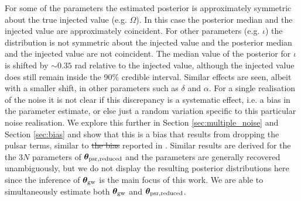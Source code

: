 \documentclass[fleqn,usenatbib,useAMS]{mnras}
\providecommand{\DIFadd}[1]{{\protect\color{blue}\uwave{#1}}} %
\providecommand{\DIFdel}[1]{{\protect\color{red}\sout{#1}}}                      %
\providecommand{\DIFaddbegin}{} %
\providecommand{\DIFaddend}{} %
\providecommand{\DIFdelbegin}{} %
\providecommand{\DIFdelend}{} %
\newcommand{\DIFscaledelfig}{0.5}
\newlength{\DIFdelgraphicswidth} %
\newlength{\DIFdelgraphicsheight} %
\newcommand{\DIFaddincludegraphics}[2][]{{\color{blue}\fbox{\DIFOincludegraphics[#1]{#2}}}} %
\newcommand{\DIFdelincludegraphics}[2][]{%
\sbox{\DIFdelgraphicsbox}{\DIFOincludegraphics[#1]{#2}}%
\settoboxwidth{\DIFdelgraphicswidth}{\DIFdelgraphicsbox} %
\settoboxtotalheight{\DIFdelgraphicsheight}{\DIFdelgraphicsbox} %
\scalebox{\DIFscaledelfig}{%
\parbox[b]{\DIFdelgraphicswidth}{\usebox{\DIFdelgraphicsbox}\\[-\baselineskip] \rule{\DIFdelgraphicswidth}{0em}}\llap{\resizebox{\DIFdelgraphicswidth}{\DIFdelgraphicsheight}{%
\setlength{\unitlength}{\DIFdelgraphicswidth}%
\begin{picture}(1,1)%
\thicklines\linethickness{2pt} %
{\color[rgb]{1,0,0}\put(0,0){\framebox(1,1){}}}%
{\color[rgb]{1,0,0}\put(0,0){\line( 1,1){1}}}%
{\color[rgb]{1,0,0}\put(0,1){\line(1,-1){1}}}%
\end{picture}%
}\hspace*{3pt}}} %
} %
\DeclareRobustCommand{\DIFaddbegin}{\DIFOaddbegin \let\includegraphics\DIFaddincludegraphics} %
\DeclareRobustCommand{\DIFaddend}{\DIFOaddend \let\includegraphics\DIFOincludegraphics} %
\DeclareRobustCommand{\DIFdelbegin}{\DIFOdelbegin \let\includegraphics\DIFdelincludegraphics} %
\DeclareRobustCommand{\DIFdelend}{\DIFOaddend \let\includegraphics\DIFOincludegraphics} %
\begin{document}
 
 For some of the parameters the estimated posterior is approximately symmetric about the true injected value (e.g. $\Omega$). In this case the posterior median and the injected value are approximately coincident. For other parameters (e.g. $\iota$) the distribution is not symmetric about the injected value and the posterior median and the injected value are not coincident. The median value of the posterior for $\iota$ is shifted by $\sim 0.35$ rad relative to the injected value, although the injected value does still remain inside the 90\% credible interval. Similar effects are seen, albeit with a smaller shift, in other parameters such as $\delta$ and $\alpha$. For a single realisation of the noise it is not clear if this discrepancy is a systematic effect, i.e. a bias in the parameter estimate, or else just a random variation specific to this particular noise realisation. We explore this further in Section \ref{sec:multiple_noise} and Section \ref{sec:bias} and show that this is a bias that results from dropping the pulsar terms, similar to \DIFdelbegin \DIFdel{the bias }\DIFdelend \DIFaddbegin \DIFadd{that }\DIFaddend reported in \cite{Zhupulsarterms}. Similar results are derived for the the 3$N$ parameters of $\boldsymbol{\theta}_{\rm psr, reduced}$ and the parameters are generally recovered unambiguously, but we do not display the resulting posterior distributions here since the inference of $\boldsymbol{\theta}_{\rm gw}$ is the main focus of this work. We are able to simultaneously estimate both $\boldsymbol{\theta}_{\rm gw}$ and $\boldsymbol{\theta}_{\rm psr, reduced}$. 
\end{document}
